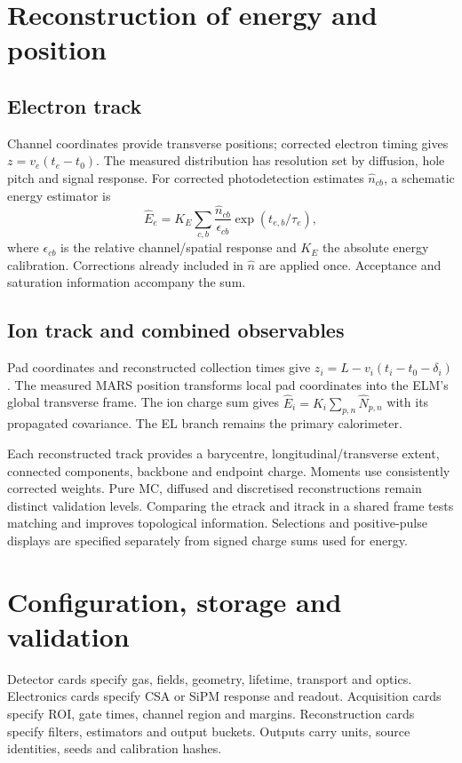 \documentclass[11pt,a4paper]{article}
\begin{document}
\section{Reconstruction of energy and position}
\subsection{Electron track}
Channel coordinates provide transverse positions; corrected electron timing
gives $z=v_e(t_e-t_0)$. The measured distribution has resolution set by
diffusion, hole pitch and signal response. For corrected photodetection
estimates $\widehat n_{cb}$, a schematic energy estimator is
\begin{equation}
 \widehat E_e=K_E\sum_{c,b}
 \frac{\widehat n_{cb}}{\epsilon_{cb}}\exp(t_{e,b}/\tau_e),
\end{equation}
where $\epsilon_{cb}$ is the relative channel/spatial response and $K_E$ the
absolute energy calibration. Corrections already included in $\widehat n$
are applied once. Acceptance and saturation information accompany the sum.

\subsection{Ion track and combined observables}
Pad coordinates and reconstructed collection times give
$z_i=L-v_i(t_i-t_0-\delta_i)$. The measured MARS position transforms local pad
coordinates into the ELM's global transverse frame. The ion charge sum gives
$\widehat E_i=K_i\sum_{p,n}\widehat N_{p,n}$ with its propagated covariance.
The EL branch remains the primary calorimeter.

Each reconstructed track provides a barycentre, longitudinal/transverse
extent, connected components, backbone and endpoint charge. Moments use
consistently corrected weights. Pure MC, diffused and discretised
reconstructions remain distinct validation levels. Comparing the etrack and
itrack in a shared frame tests matching and improves topological information.
Selections and positive-pulse displays are specified separately from signed
charge sums used for energy.

\section{Configuration, storage and validation}
Detector cards specify gas, fields, geometry, lifetime, transport and optics.
Electronics cards specify CSA or SiPM response and readout. Acquisition cards
specify ROI, gate times, channel region and margins. Reconstruction cards
specify filters, estimators and output buckets. Outputs carry units, source
identities, seeds and calibration hashes.
\end{document}

